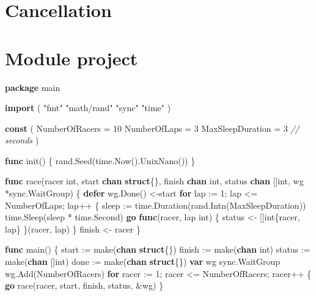 \documentclass[]{book}
\newenvironment{Shaded}{\begin{snugshade}}{\end{snugshade}}
\newcommand{\BuiltInTok}[1]{#1}
\newcommand{\CommentTok}[1]{\textcolor[rgb]{0.56,0.35,0.01}{\textit{#1}}}
\newcommand{\DataTypeTok}[1]{\textcolor[rgb]{0.13,0.29,0.53}{#1}}
\newcommand{\DecValTok}[1]{\textcolor[rgb]{0.00,0.00,0.81}{#1}}
\newcommand{\KeywordTok}[1]{\textcolor[rgb]{0.13,0.29,0.53}{\textbf{#1}}}
\newcommand{\NormalTok}[1]{#1}
\newcommand{\StringTok}[1]{\textcolor[rgb]{0.31,0.60,0.02}{#1}}
\begin{document}
\hypertarget{cancellation}{%
\section{Cancellation}\label{cancellation}}

\hypertarget{module-project-6}{%
\section*{Module project}\label{module-project-6}}

\begin{Shaded}
\begin{Highlighting}[]
\KeywordTok{package}\NormalTok{ main}

\KeywordTok{import}\NormalTok{ (}
    \StringTok{"fmt"}
    \StringTok{"math/rand"}
    \StringTok{"sync"}
    \StringTok{"time"}
\NormalTok{)}

\KeywordTok{const}\NormalTok{ (}
\NormalTok{    NumberOfRacers   = }\DecValTok{10}
\NormalTok{    NumberOfLaps     = }\DecValTok{3}
\NormalTok{    MaxSleepDuration = }\DecValTok{3} \CommentTok{// seconds}
\NormalTok{)}

\KeywordTok{func}\NormalTok{ init() \{}
\NormalTok{    rand.Seed(time.Now().UnixNano())}
\NormalTok{\}}

\KeywordTok{func}\NormalTok{ race(racer }\DataTypeTok{int}\NormalTok{, start }\KeywordTok{chan} \KeywordTok{struct}\NormalTok{\{\}, finish }\KeywordTok{chan} \DataTypeTok{int}\NormalTok{, status }\KeywordTok{chan}\NormalTok{ []}\DataTypeTok{int}\NormalTok{, wg *sync.WaitGroup) \{}
    \KeywordTok{defer}\NormalTok{ wg.Done()}
\NormalTok{    <-start}
    \KeywordTok{for}\NormalTok{ lap := }\DecValTok{1}\NormalTok{; lap <= NumberOfLaps; lap++ \{}
\NormalTok{        sleep := time.Duration(rand.Intn(MaxSleepDuration))}
\NormalTok{        time.Sleep(sleep * time.Second)}
        \KeywordTok{go} \KeywordTok{func}\NormalTok{(racer, lap }\DataTypeTok{int}\NormalTok{) \{}
\NormalTok{            status <- []}\DataTypeTok{int}\NormalTok{\{racer, lap\}}
\NormalTok{        \}(racer, lap)}
\NormalTok{    \}}
\NormalTok{    finish <- racer}
\NormalTok{\}}

\KeywordTok{func}\NormalTok{ main() \{}
\NormalTok{    start := }\BuiltInTok{make}\NormalTok{(}\KeywordTok{chan} \KeywordTok{struct}\NormalTok{\{\})}
\NormalTok{    finish := }\BuiltInTok{make}\NormalTok{(}\KeywordTok{chan} \DataTypeTok{int}\NormalTok{)}
\NormalTok{    status := }\BuiltInTok{make}\NormalTok{(}\KeywordTok{chan}\NormalTok{ []}\DataTypeTok{int}\NormalTok{)}
\NormalTok{    done := }\BuiltInTok{make}\NormalTok{(}\KeywordTok{chan} \KeywordTok{struct}\NormalTok{\{\})}
    \KeywordTok{var}\NormalTok{ wg sync.WaitGroup}
\NormalTok{    wg.Add(NumberOfRacers)}
    \KeywordTok{for}\NormalTok{ racer := }\DecValTok{1}\NormalTok{; racer <= NumberOfRacers; racer++ \{}
        \KeywordTok{go}\NormalTok{ race(racer, start, finish, status, &wg)}
\NormalTok{    \}}


\end{Highlighting}
\end{Shaded}
\end{document}
